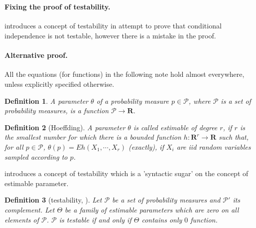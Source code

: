 \documentclass{article}
\title{}
\author{KC}
\date{}
\newtheorem{definition}{Definition}
\begin{document}
\maketitle

\section{}


\paragraph{Fixing the proof of testability.}
\cite{bergsma2004testing} introduces a concept of testability in attempt to prove that conditional independence is not testable, however there is a mistake in the proof.



\paragraph{Alternative proof.}
All the equations (for functions) in the following note  hold almost everywhere, unless explicitly specified otherwise.
\begin{definition}
 A parameter  $\theta$ of a probability measure $p \in \mathcal P$, where $\mathcal P$ is a set of probability measures, is a function $\mathcal P  \to  \mathbf R$.   
\end{definition}


\begin{definition}[Hoeffding]
A parameter  $\theta$ is called estimable of degree $r$, if $r$ is the smallest number for which there is a bounded function $h : \mathbf R^{r} \to \mathbf R$ such that, for all $p \in \mathcal P$, $ \theta(p) = Eh(X_1, \cdots , X_r)$ (exactly),  if $X_i$ are iid random variables sampled according to $p$.
\end{definition}

\cite{bergsma2004testing} introduces a concept of testability which is a 'syntactic sugar' on the concept of estimable parameter.

\begin{definition}[testability, \cite{bergsma2004testing}]
 Let $\mathcal{P}$ be a set of probability measures and $\mathcal{P}'$ its complement. Let $\Theta$ be a family of  estimable parameters which are zero on all elements of $\mathcal{P}$.  $\mathcal{P}$ is testable if and only if $\Theta$ contains only $0$ function.    
\end{definition}
\end{document}
